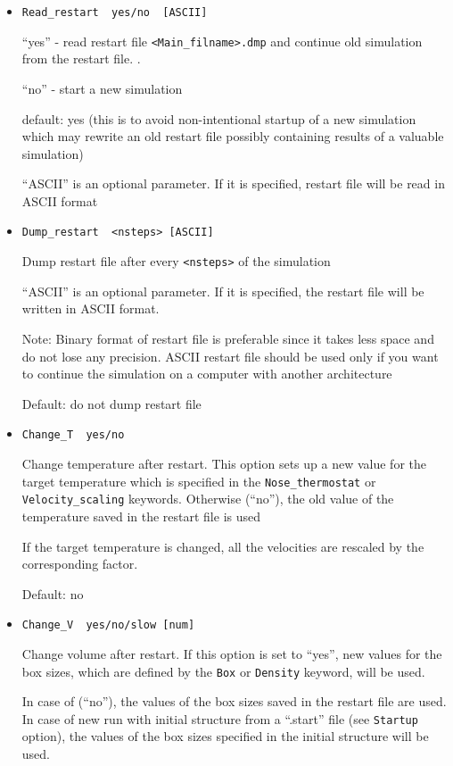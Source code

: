 \documentclass{article}
\begin{document}
\begin{itemize}

\item
\verb|Read_restart  yes/no  [ASCII]|

``yes'' - read restart file \verb|<Main_filname>.dmp| and continue old 
simulation from the restart file.
.

``no''  - start a new simulation

default: yes  (this is to avoid non-intentional startup of a new simulation
which may rewrite an old restart file possibly containing results of a 
valuable simulation)

``ASCII'' is an optional parameter. If it is specified, restart file 
will be read in ASCII format 

\item
\verb|Dump_restart  <nsteps> [ASCII]|
 
Dump restart file after every \verb|<nsteps>| of the simulation

``ASCII'' is an optional parameter. If it is specified, the restart file 
will be written in ASCII format. 

Note: Binary format of restart file is preferable since it takes less 
space and do not lose any precision. ASCII restart file should be used only 
if you want to continue the simulation on a computer with another architecture

Default: do not dump restart file 

\item
\verb|Change_T  yes/no|

Change temperature after restart. This option sets up a new value for the 
target temperature which is specified in the \verb|Nose_thermostat| or 
\verb|Velocity_scaling| keywords. Otherwise (``no''), the old value of 
the temperature saved in the restart file is used

If the target temperature is changed, all the velocities are rescaled by
the corresponding factor.

Default: no

\item
\verb|Change_V  yes/no/slow [num]|

Change volume after restart. If this option is set to ``yes'', 
new values for the box sizes, which are defined by the 
\verb|Box| or \verb|Density| keyword, will be used.

In case of (``no''), the values of the box sizes saved in the
restart file are used. In case of new run with initial structure 
from a  ``.start'' file (see \verb|Startup| option),
the values of the box sizes specified in the initial structure 
will be used.


\end{itemize}
\end{document}
